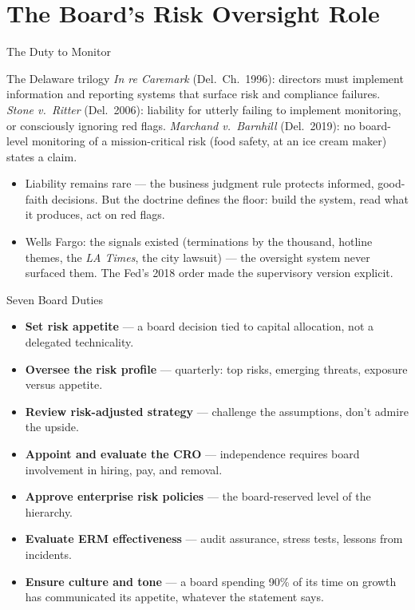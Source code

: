 \documentclass[11pt, aspectratio=169]{beamer}
\begin{document}
\section{The Board's Risk Oversight Role}

\begin{frame}{The Duty to Monitor}
\begin{block}{The Delaware trilogy}
\emph{In re Caremark} (Del.\ Ch.\ 1996): directors must implement information and reporting systems that surface risk and compliance failures. \emph{Stone v.\ Ritter} (Del.\ 2006): liability for utterly failing to implement monitoring, or \alert{consciously ignoring red flags}. \emph{Marchand v.\ Barnhill} (Del.\ 2019): no board-level monitoring of a \alert{mission-critical risk} (food safety, at an ice cream maker) states a claim.
\end{block}
\medskip
\begin{itemize}
  \item Liability remains rare --- the business judgment rule protects informed, good-faith decisions. But the doctrine defines the floor: build the system, read what it produces, act on red flags.
  \item Wells Fargo: the signals existed (terminations by the thousand, hotline themes, the \emph{LA Times}, the city lawsuit) --- the oversight system never surfaced them. The Fed's 2018 order made the supervisory version explicit.
\end{itemize}
\end{frame}

\begin{frame}{Seven Board Duties}
\begin{itemize}
  \item \textbf{Set risk appetite} --- a board decision tied to capital allocation, not a delegated technicality.
  \item \textbf{Oversee the risk profile} --- quarterly: top risks, emerging threats, exposure versus appetite.
  \item \textbf{Review risk-adjusted strategy} --- challenge the assumptions, don't admire the upside.
  \item \textbf{Appoint and evaluate the CRO} --- independence requires board involvement in hiring, pay, and removal.
  \item \textbf{Approve enterprise risk policies} --- the board-reserved level of the hierarchy.
  \item \textbf{Evaluate ERM effectiveness} --- audit assurance, stress tests, lessons from incidents.
  \item \textbf{Ensure culture and tone} --- a board spending 90\% of its time on growth has communicated its appetite, whatever the statement says.
\end{itemize}
\end{frame}
\end{document}
